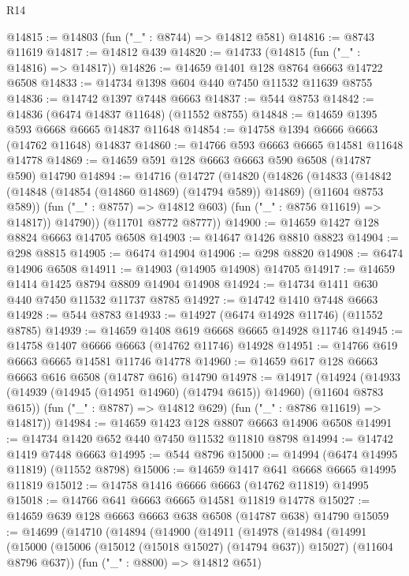 \begin{lexlean}{R14}
\begin{coremodule}
@14815 := @14803 (fun ("_" : @8744) => @14812 @581)
@14816 := @8743 @11619
@14817 := @14812 @439
@14820 := @14733 (@14815 (fun ("_" : @14816) => @14817))
@14826 := @14659 @1401 @128 @8764 @6663 @14722 @6508
@14833 := @14734 @1398 @604 @440 @7450 @11532 @11639 @8755
@14836 := @14742 @1397 @7448 @6663
@14837 := @544 @8753
@14842 := @14836 (@6474 @14837 @11648) (@11552 @8755)
@14848 := @14659 @1395 @593 @6668 @6665 @14837 @11648
@14854 := @14758 @1394 @6666 @6663 (@14762 @11648) @14837
@14860 := @14766 @593 @6663 @6665 @14581 @11648 @14778
@14869 := @14659 @591 @128 @6663 @6663 @590 @6508 (@14787 @590) @14790
@14894 := @14716
    (@14727
      (@14820
        (@14826
          (@14833
            (@14842 (@14848 (@14854 (@14860 @14869) (@14794 @589)) @14869) (@11604 @8753 @589))
            (fun ("_" : @8757) => @14812 @603)
            (fun ("_" : @8756 @11619) => @14817))
          @14790))
      (@11701 @8772 @8777))
@14900 := @14659 @1427 @128 @8824 @6663 @14705 @6508
@14903 := @14647 @1426 @8810 @8823
@14904 := @298 @8815
@14905 := @6474 @14904
@14906 := @298 @8820
@14908 := @6474 @14906 @6508
@14911 := @14903 (@14905 @14908) @14705
@14917 := @14659 @1414 @1425 @8794 @8809 @14904 @14908
@14924 := @14734 @1411 @630 @440 @7450 @11532 @11737 @8785
@14927 := @14742 @1410 @7448 @6663
@14928 := @544 @8783
@14933 := @14927 (@6474 @14928 @11746) (@11552 @8785)
@14939 := @14659 @1408 @619 @6668 @6665 @14928 @11746
@14945 := @14758 @1407 @6666 @6663 (@14762 @11746) @14928
@14951 := @14766 @619 @6663 @6665 @14581 @11746 @14778
@14960 := @14659 @617 @128 @6663 @6663 @616 @6508 (@14787 @616) @14790
@14978 := @14917
    (@14924
      (@14933 (@14939 (@14945 (@14951 @14960) (@14794 @615)) @14960) (@11604 @8783 @615))
      (fun ("_" : @8787) => @14812 @629)
      (fun ("_" : @8786 @11619) => @14817))
@14984 := @14659 @1423 @128 @8807 @6663 @14906 @6508
@14991 := @14734 @1420 @652 @440 @7450 @11532 @11810 @8798
@14994 := @14742 @1419 @7448 @6663
@14995 := @544 @8796
@15000 := @14994 (@6474 @14995 @11819) (@11552 @8798)
@15006 := @14659 @1417 @641 @6668 @6665 @14995 @11819
@15012 := @14758 @1416 @6666 @6663 (@14762 @11819) @14995
@15018 := @14766 @641 @6663 @6665 @14581 @11819 @14778
@15027 := @14659 @639 @128 @6663 @6663 @638 @6508 (@14787 @638) @14790
@15059 := @14699
    (@14710
      (@14894
        (@14900
          (@14911
            (@14978
              (@14984
                (@14991
                  (@15000
                    (@15006 (@15012 (@15018 @15027) (@14794 @637)) @15027)
                    (@11604 @8796 @637))
                  (fun ("_" : @8800) => @14812 @651)

\end{coremodule}
\end{lexlean}
